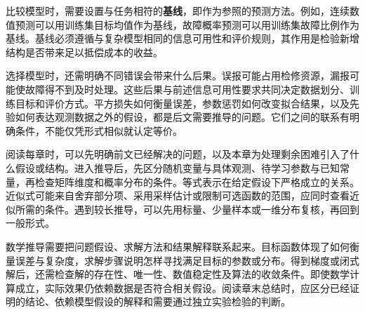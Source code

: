 \documentclass[UTF8,11pt,zihao=false,linespread=1.3,openany]{ctexbook}
\begin{document}
比较模型时，需要设置与任务相符的\textbf{基线}，即作为参照的预测方法。例如，连续数值预测可以用训练集目标均值作为基线，故障概率预测可以用训练集故障比例作为基线。基线必须遵循与复杂模型相同的信息可用性和评价规则，其作用是检验新增结构是否带来足以抵偿成本的收益。

选择模型时，还需明确不同错误会带来什么后果。误报可能占用检修资源，漏报可能使故障得不到及时处理。这些后果与前述信息可用性要求共同决定数据划分、训练目标和评价方式。平方损失如何衡量误差，参数惩罚如何改变拟合结果，以及先验如何表达观测数据之外的假设，都是后文需要推导的问题。它们之间的联系有明确条件，不能仅凭形式相似就认定等价。

阅读每章时，可以先明确前文已经解决的问题，以及本章为处理剩余困难引入了什么假设或结构。进入推导后，先区分随机变量与具体观测、待学习参数与已知常量，再检查矩阵维度和概率分布的条件。等式表示在给定假设下严格成立的关系。近似式可能来自舍弃部分项、采用采样估计或限制可选函数的范围，应同时查看近似所需的条件。遇到较长推导，可以先用标量、少量样本或一维分布复核，再回到一般形式。

数学推导需要把问题假设、求解方法和结果解释联系起来。目标函数体现了如何衡量误差与复杂度，求解步骤说明怎样寻找满足目标的参数或分布。得到梯度或闭式解后，还需检查解的存在性、唯一性、数值稳定性及算法的收敛条件。即使数学计算成立，实际效果仍依赖数据是否符合相关假设。阅读章末总结时，应区分已经证明的结论、依赖模型假设的解释和需要通过独立实验检验的判断。
\end{document}
